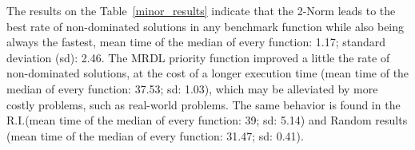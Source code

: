 The results on the Table~\ref{minor_results} indicate that the 2-Norm leads to the best rate of non-dominated solutions in any benchmark function while also being always the fastest, mean time of the median of every function: 1.17; standard deviation (sd): 2.46. The MRDL priority function improved a little the rate of non-dominated solutions, at the cost of a longer execution time (mean time of the median of every function: 37.53; sd: 1.03), which may be alleviated by more costly problems, such as real-world problems.  The same behavior is found in the R.I.(mean time of the median of every function: 39; sd: 5.14) and Random results (mean time of the median of every function: 31.47; sd: 0.41). 
























